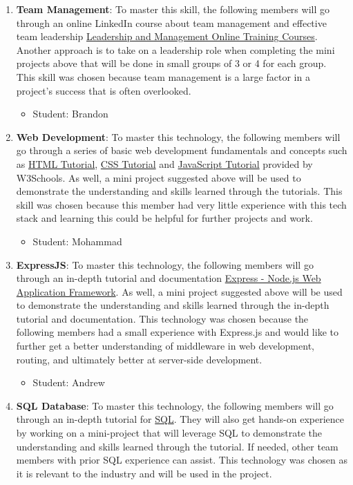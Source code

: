 \documentclass{article}
\begin{document}
\begin{enumerate}
    \item \textbf{Team Management}: To master this skill, the following members will go through an online LinkedIn course about team management and effective team leadership \href{https://www.linkedin.com/learning/topics/leadership-and-management}{Leadership and Management Online Training Courses}. Another approach is to take on a leadership role when completing the mini projects above that will be done in small groups of 3 or 4 for each group. This skill was chosen because team management is a large factor in a project's success that is often overlooked.
        \begin{itemize}
                \item Student: Brandon
            \end{itemize}
    \item \textbf{Web Development}: To master this technology, the following members will go through a series of basic web development fundamentals and concepts such as \href{https://www.w3schools.com/html/default.asp}{HTML Tutorial}, \href{https://www.w3schools.com/css/default.asp}{CSS Tutorial} and \href{https://www.w3schools.com/js/default.asp}{JavaScript Tutorial} provided by W3Schools. As well, a mini project suggested above will be used to demonstrate the understanding and skills learned through the tutorials. This skill was chosen because this member had very little experience with this tech stack and learning this could be helpful for further projects and work.
        \begin{itemize}
                \item Student: Mohammad 
            \end{itemize}
    \item \textbf{ExpressJS}: To master this technology, the following members will go through an in-depth tutorial and documentation \href{https://expressjs.com/}{Express - Node.js Web Application Framework}. As well, a mini project suggested above will be used to demonstrate the understanding and skills learned through the in-depth tutorial and documentation. This technology was chosen because the following members had a small experience with Express.js and would like to further get a better understanding of middleware in web development, routing, and ultimately better at server-side development.
        \begin{itemize}
                \item Student: Andrew 
            \end{itemize}
    \item \textbf{SQL Database}: To master this technology, the following members will go through an in-depth tutorial for \href{https://www.w3schools.com/sql/default.asp}{SQL}. They will also get hands-on experience by working on a mini-project that will leverage SQL to demonstrate the understanding and skills learned through the tutorial. If needed, other team members with prior SQL experience can assist. This technology was chosen as it is relevant to the industry and will be used in the project.

\end{enumerate}
\end{document}
